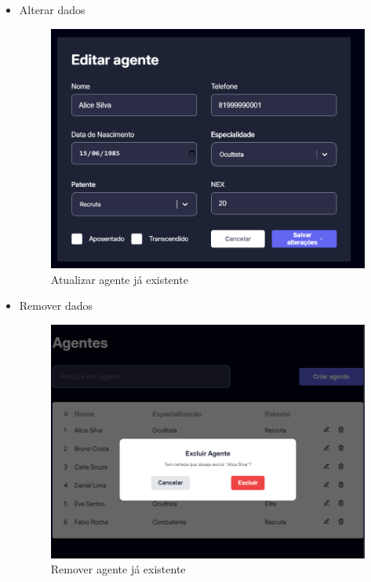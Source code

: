 \documentclass[12pt,a4paper]{report}
\begin{document}
\begin{itemize}
        \item Alterar dados
        \begin{figure}[H]
            \centering
            \includegraphics[width=0.5\linewidth]{agentes_update.png}
            \caption{Atualizar agente já existente}
            \label{fig:enter-label}
        \end{figure}

        \item Remover dados
        \begin{figure}[H]
            \centering
            \includegraphics[width=0.5\linewidth]{agentes_remove.png}
            \caption{Remover agente já existente}
            \label{fig:enter-label}
        \end{figure}
    \end{itemize}
\end{document}
